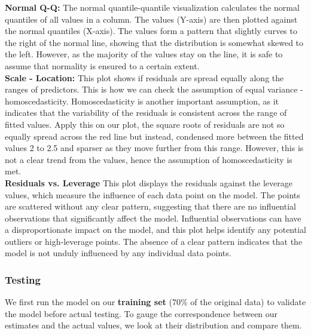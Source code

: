 \textbf{Normal Q-Q:} The normal quantile-quantile visualization calculates the normal quantiles of all values in a column. The values (Y-axis) are then plotted against the normal quantiles (X-axis). The values form a pattern that slightly curves to the right of the normal line, showing that the distribution is somewhat skewed to the left. However, as the majority of the values stay on the line, it is safe to assume that normality is ensured to a certain extent. \\

\textbf{Scale - Location:} This plot shows if residuals are spread equally along the ranges of predictors. This is how we can check the assumption of equal variance - homoscedasticity. Homoscedasticity is another important assumption, as it indicates that the variability of the residuals is consistent across the range of fitted values. Apply this on our plot, the square roots of residuals are not so equally spread across the red line but instead, condensed more between the fitted values 2 to 2.5 and sparser as they move further from this range. However, this is not a clear trend from the values, hence the assumption of homoscedasticity is met.\\

\textbf{Residuals vs. Leverage} This plot displays the residuals against the leverage values, which measure the influence of each data point on the model. The points are scattered without any clear pattern, suggesting that there are no influential observations that significantly affect the model. Influential observations can have a disproportionate impact on the model, and this plot helps identify any potential outliers or high-leverage points. The absence of a clear pattern indicates that the model is not unduly influenced by any individual data points. \\

\subsubsection{Testing}
We first run the model on our \textbf{training set} (70\% of the original data) to validate the model before actual testing. To gauge the correspondence between our estimates and the actual values, we look at their distribution and compare them.\\

